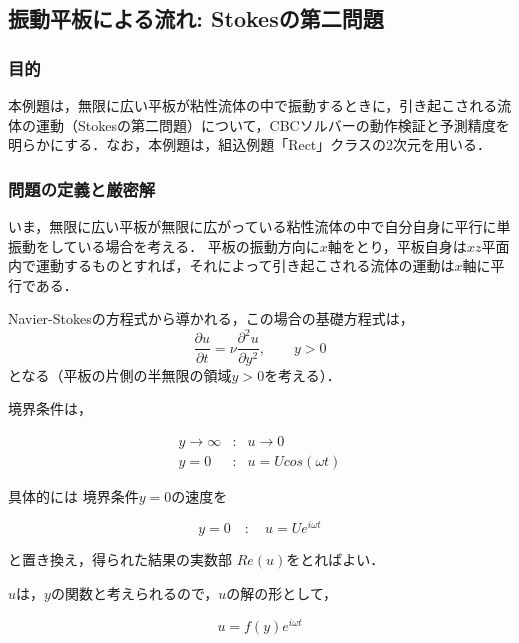\graphicspath{{./fig_stokes2nd/}}

\subsection{振動平板による流れ: Stokesの第二問題}

\subsubsection{目的}
本例題は，無限に広い平板が粘性流体の中で振動するときに，引き起こされる流体の運動\cite{hino:74:fd, imai:73}（Stokesの第二問題）について，CBCソルバーの動作検証と予測精度を明らかにする．なお，本例題は，組込例題「Rect」クラスの2次元を用いる．

\subsubsection{問題の定義と厳密解}
いま，無限に広い平板が無限に広がっている粘性流体の中で自分自身に平行に単振動をしている場合を考える．
平板の振動方向に$x$軸をとり，平板自身は$xz$平面内で運動するものとすれば，それによって引き起こされる流体の運動は$x$軸に平行である．

Navier-Stokesの方程式から導かれる，この場合の基礎方程式は，
\begin{equation}
\frac{\partial u}{\partial t} = \nu \frac{\partial^2 u}{\partial y^2},\mbox{　　} y>0
\label{eq:kiso}
\end{equation}
となる（平板の片側の半無限の領域$y>0$を考える）．

境界条件は，

\begin{equation}
\begin{array}{lcl}
y \rightarrow \infty & : & u \rightarrow 0 \\
y = 0 & : & u = U cos (\omega t)
\end{array}
\label{eq:kyokai}
\end{equation}

具体的には
境界条件$y=0$の速度を

\begin{equation}
y=0\mbox{　}:\mbox{　}u=U e^{i \omega t}
\label{eq:kyokai_e}
\end{equation}

と置き換え，得られた結果の実数部
$Re(u)$をとればよい．

$u$は，$y$の関数と考えられるので，$u$の解の形として，

\begin{equation*}
u=f(y)e^{i \omega t}
\end{equation*}

